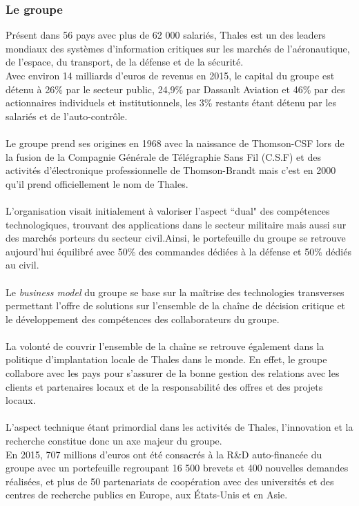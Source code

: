 \documentclass[12pt]{article}
\begin{document}
\subsubsection{Le groupe}
Présent dans 56 pays avec plus de 62 000 salariés, Thales est un des leaders mondiaux des systèmes d'information critiques sur les marchés de l'aéronautique, de l'espace, du transport, de la défense et de la sécurité.\\
Avec environ 14 milliards d'euros de revenus en 2015, le capital du groupe est détenu à 26\% par le secteur public, 24,9\% par Dassault Aviation et 46\% par des actionnaires individuels et institutionnels, les 3\% restants étant détenu par les salariés et de l'auto-contrôle.\\
\\
Le groupe prend ses origines en 1968 avec la naissance de Thomson-CSF lors de la fusion de la Compagnie Générale de Télégraphie Sans Fil (C.S.F) et des activités d'électronique professionnelle de Thomson-Brandt mais c'est en 2000 qu'il prend officiellement le nom de Thales.\\
\\
L'organisation visait initialement à valoriser l'aspect ``dual" des compétences technologiques, trouvant des applications dans le secteur militaire mais aussi sur des marchés porteurs du secteur civil.Ainsi, le portefeuille du groupe se retrouve aujourd'hui équilibré avec 50\% des commandes dédiées à la défense et 50\% dédiés au civil.\\
\\
Le \textit{business model} du groupe se base sur la maîtrise des technologies transverses permettant l'offre de solutions sur l'ensemble de la chaîne de décision critique et le développement des compétences des collaborateurs du groupe.\\
\\
La volonté de couvrir l'ensemble de la chaîne se retrouve également dans la politique d'implantation locale de Thales dans le monde. En effet, le groupe collabore avec les pays pour s'assurer de la bonne gestion des relations avec les clients et partenaires locaux et de la responsabilité des offres et des projets locaux.\\
\\
L'aspect technique étant primordial dans les activités de Thales, l'innovation et la recherche constitue donc un axe majeur du groupe.\\
En 2015, 707 millions d'euros ont été consacrés à la R\&D auto-financée du groupe avec un portefeuille regroupant 16 500 brevets et 400 nouvelles demandes réalisées, et plus de 50 partenariats de coopération avec des universités et des centres de recherche publics en Europe, aux États-Unis et en Asie. \\
\end{document}
